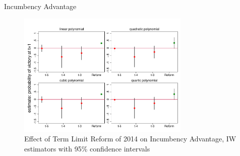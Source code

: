 \documentclass{beamer}
\begin{document}
\begin{frame}[label=incumbency_advantage]{Incumbency Advantage}
\begin{figure}[h] 
\centering
\caption{Effect of Term Limit Reform of 2014 on Incumbency Advantage, IW estimators with 95\% confidence intervals}
\label{fig:incumbency_adv_1234}
\includegraphics[width=0.73\textwidth]{Figures_pres/incumbency_advantage_234.pdf}
       \captionsetup{justification=centering}


\end{figure} 
\end{frame}
\end{document}
